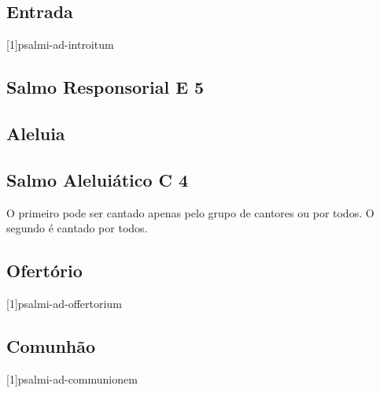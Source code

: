 
\subsection{Entrada}\label{subsection:missae-vitivae/missa-votiva-de-sanctissima-eucharistia/introitus}
[1]{psalmi-ad-introitum}

\AllowPageFlush

\subsection[Salmo Responsorial]{Salmo Responsorial \textmd{E 5}}\label{subsection:missae-vitivae/missa-votiva-de-sanctissima-eucharistia/psalmus-responsorius}

\AllowPageFlush

\subsection{Aleluia}\label{subsection:missae-vitivae/missa-votiva-de-sanctissima-eucharistia/alleluia}

\AllowPageFlush

\subsection[Salmo Aleluiático]{Salmo Aleluiático \textmd{C 4}}\label{subsection:missae-vitivae/missa-votiva-de-sanctissima-eucharistia/psalmus-alleluiaticus}
\begin{rubrica}
  O primeiro {\normalfont\Rbar} pode ser cantado apenas pelo grupo de cantores ou por todos. O segundo {\normalfont\Rbar} é cantado por todos.
\end{rubrica}

\AllowPageFlush

\subsection{Ofertório}\label{subsection:missae-vitivae/missa-votiva-de-sanctissima-eucharistia/offertorium}
[1]{psalmi-ad-offertorium}

\AllowPageFlush

\subsection{Comunhão}\label{subsection:missae-vitivae/missa-votiva-de-sanctissima-eucharistia/communio}
[1]{psalmi-ad-communionem}